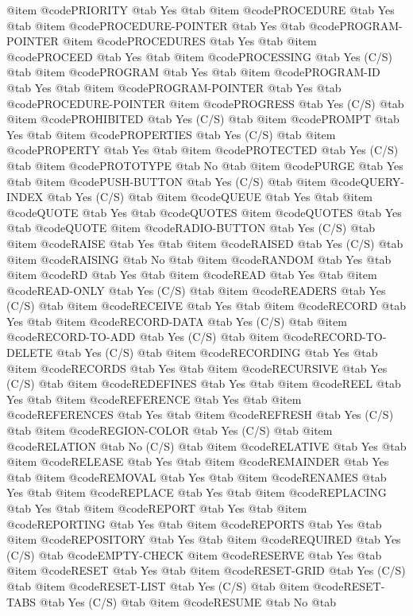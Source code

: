 @item @code{PRIORITY} @tab Yes @tab 
@item @code{PROCEDURE} @tab Yes @tab 
@item @code{PROCEDURE-POINTER} @tab Yes @tab @code{PROGRAM-POINTER}
@item @code{PROCEDURES} @tab Yes @tab 
@item @code{PROCEED} @tab Yes @tab 
@item @code{PROCESSING} @tab Yes	(C/S) @tab 
@item @code{PROGRAM} @tab Yes @tab 
@item @code{PROGRAM-ID} @tab Yes @tab 
@item @code{PROGRAM-POINTER} @tab Yes @tab @code{PROCEDURE-POINTER}
@item @code{PROGRESS} @tab Yes	(C/S) @tab 
@item @code{PROHIBITED} @tab Yes	(C/S) @tab 
@item @code{PROMPT} @tab Yes @tab 
@item @code{PROPERTIES} @tab Yes	(C/S) @tab 
@item @code{PROPERTY} @tab Yes @tab 
@item @code{PROTECTED} @tab Yes	(C/S) @tab 
@item @code{PROTOTYPE} @tab No @tab 
@item @code{PURGE} @tab Yes @tab 
@item @code{PUSH-BUTTON} @tab Yes	(C/S) @tab 
@item @code{QUERY-INDEX} @tab Yes	(C/S) @tab 
@item @code{QUEUE} @tab Yes @tab 
@item @code{QUOTE} @tab Yes @tab @code{QUOTES}
@item @code{QUOTES} @tab Yes @tab @code{QUOTE}
@item @code{RADIO-BUTTON} @tab Yes	(C/S) @tab 
@item @code{RAISE} @tab Yes @tab 
@item @code{RAISED} @tab Yes	(C/S) @tab 
@item @code{RAISING} @tab No @tab 
@item @code{RANDOM} @tab Yes @tab 
@item @code{RD} @tab Yes @tab 
@item @code{READ} @tab Yes @tab 
@item @code{READ-ONLY} @tab Yes	(C/S) @tab 
@item @code{READERS} @tab Yes	(C/S) @tab 
@item @code{RECEIVE} @tab Yes @tab 
@item @code{RECORD} @tab Yes @tab 
@item @code{RECORD-DATA} @tab Yes	(C/S) @tab 
@item @code{RECORD-TO-ADD} @tab Yes	(C/S) @tab 
@item @code{RECORD-TO-DELETE} @tab Yes	(C/S) @tab 
@item @code{RECORDING} @tab Yes @tab 
@item @code{RECORDS} @tab Yes @tab 
@item @code{RECURSIVE} @tab Yes	(C/S) @tab 
@item @code{REDEFINES} @tab Yes @tab 
@item @code{REEL} @tab Yes @tab 
@item @code{REFERENCE} @tab Yes @tab 
@item @code{REFERENCES} @tab Yes @tab 
@item @code{REFRESH} @tab Yes	(C/S) @tab 
@item @code{REGION-COLOR} @tab Yes	(C/S) @tab 
@item @code{RELATION} @tab No	(C/S) @tab 
@item @code{RELATIVE} @tab Yes @tab 
@item @code{RELEASE} @tab Yes @tab 
@item @code{REMAINDER} @tab Yes @tab 
@item @code{REMOVAL} @tab Yes @tab 
@item @code{RENAMES} @tab Yes @tab 
@item @code{REPLACE} @tab Yes @tab 
@item @code{REPLACING} @tab Yes @tab 
@item @code{REPORT} @tab Yes @tab 
@item @code{REPORTING} @tab Yes @tab 
@item @code{REPORTS} @tab Yes @tab 
@item @code{REPOSITORY} @tab Yes @tab 
@item @code{REQUIRED} @tab Yes	(C/S) @tab @code{EMPTY-CHECK}
@item @code{RESERVE} @tab Yes @tab 
@item @code{RESET} @tab Yes @tab 
@item @code{RESET-GRID} @tab Yes	(C/S) @tab 
@item @code{RESET-LIST} @tab Yes	(C/S) @tab 
@item @code{RESET-TABS} @tab Yes	(C/S) @tab 
@item @code{RESUME} @tab No @tab 
